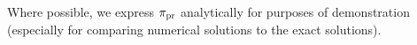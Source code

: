%
%
%


Where possible, we express $\operatorname*{\pi_{pr}}$ analytically for purposes of demonstration (especially for comparing numerical solutions to the exact solutions). 